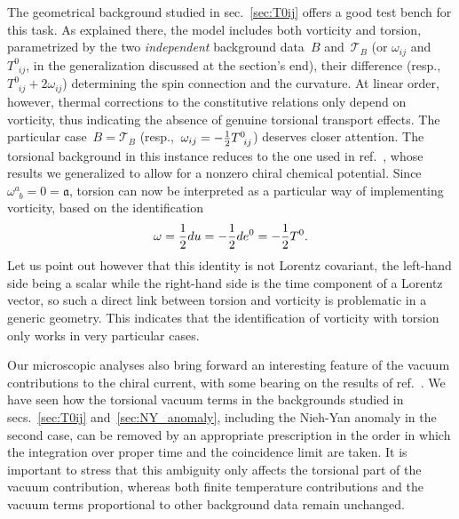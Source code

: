 \documentclass[11pt,a4paper]{article}
\begin{document}
The geometrical background studied in sec.~\ref{sec:T0ij} offers a good test bench for this
task. As explained there, the model includes both vorticity and torsion,
parametrized by the two {\em independent} background 
data~$B$ and~$\mathcal{T}_{B}$ (or $\omega_{ij}$ and~$T^{0}_{\,\,\,ij}$,
in the generalization discussed at the section's end),
their difference (resp.,~$T^{0}_{\,\,\,ij}+2\omega_{ij}$) determining the 
spin connection and the curvature.
At linear order, however, thermal corrections to the constitutive relations 
only depend on vorticity, thus indicating
the absence of genuine torsional transport effects.
The particular case~$B=\mathcal{T}_{B}$ 
(resp.,~$\omega_{ij}=-{1\over 2}T^{0}_{\,\,\,ij}$) deserves closer attention. 
The torsional background in this instance reduces to the one
used in ref.~\cite{Khaidukov:2018oat}, whose results we generalized to 
allow for a nonzero chiral chemical potential. 
Since~$\omega^{a}_{\,\,\,b}=0=\mathfrak{a}$,
torsion can now be
interpreted as a particular way of implementing vorticity, based on the
identification
\begin{align}
\omega={1\over 2}du=-{1\over 2}de^{0}=-{1\over 2}T^{0}.
\label{eq:identification} 
\end{align}
Let us point out however that this identity 
is not Lorentz covariant, the left-hand side being a scalar
while the right-hand side is the time component of a Lorentz vector, so such a direct link
between torsion and vorticity is problematic in a generic geometry. This indicates that
the identification of vorticity with torsion only works in very particular cases.

Our microscopic analyses also bring forward an interesting
feature of the vacuum contributions to the chiral current, with some bearing on 
the results of ref.~\cite{Valle:2021nfv}. We have seen how the torsional vacuum terms in 
the backgrounds studied in secs.~\ref{sec:T0ij} 
and~\ref{sec:NY_anomaly}, including the Nieh-Yan anomaly 
in the second case, can be removed by
an appropriate prescription in the order in which the integration over proper time and
the coincidence limit are taken. It is important to stress that
this ambiguity only affects the torsional part
of the vacuum contribution, whereas both 
finite temperature contributions and the 
vacuum terms proportional to other background data remain unchanged. 
\end{document}
